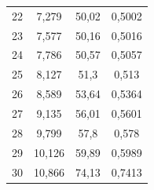 \documentclass[12pt]{article}
\begin{document}
\begin{figure}[h!]
\begin{minipage}[h]{0.49\linewidth}
\begin{tabular}{ | c | c | c | c | }
            22 & 7,279 & 50,02 & 0,5002 \\
            23 & 7,577 & 50,16 & 0,5016 \\
            24 & 7,786 & 50,57 & 0,5057 \\
            25 & 8,127 & 51,3 & 0,513 \\
            26 & 8,589 & 53,64 & 0,5364 \\
            27 & 9,135 & 56,01 & 0,5601 \\
            28 & 9,799 & 57,8 & 0,578 \\
            29 & 10,126 & 59,89 & 0,5989 \\
            30 & 10,866 & 74,13 & 0,7413 \\
            \hline
          \end{tabular}

        \end{minipage}
        \begin{minipage}[h]{0.49\linewidth}


\end{minipage}
\end{figure}
\end{document}
